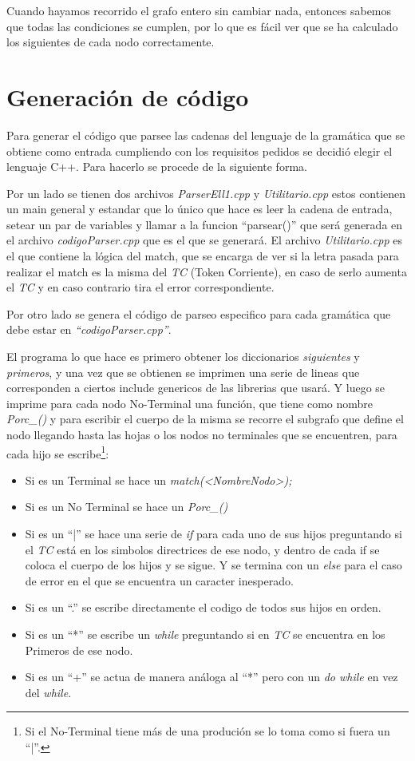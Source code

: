 \documentclass[a4paper]{report}
\begin{document}
	Cuando hayamos recorrido el grafo entero sin cambiar nada, entonces
sabemos que todas las condiciones se cumplen, por lo que es fácil ver que se ha
calculado los siguientes de cada nodo correctamente.


\section*{Generación de código}


Para generar el código que parsee las cadenas del lenguaje de la gramática que se 
obtiene como entrada cumpliendo con los requisitos pedidos se decidió elegir el lenguaje C++. Para hacerlo se procede de la siguiente forma.


Por un lado se tienen dos archivos \emph{ParserEll1.cpp} y \emph{Utilitario.cpp} estos contienen un main general y estandar
que lo único que hace es leer la cadena de entrada, setear un par de variables y llamar a la funcion ``parsear()'' 
que será generada en el archivo \emph{codigoParser.cpp} que es el que se generará. El archivo \emph{Utilitario.cpp} 
es el que contiene la lógica del match, que se encarga de ver si la letra pasada para realizar el match es la misma del \emph{TC} 
(Token Corriente), en caso de serlo aumenta el \emph{TC} y en caso contrario tira el error correspondiente.


Por otro lado se genera el código de parseo especifico para cada gramática que debe estar en \emph{``codigoParser.cpp''}.


El programa lo que hace es primero obtener los diccionarios \emph{siguientes} y \emph{primeros}, y una vez que se obtienen se imprimen una serie de lineas que corresponden a ciertos include genericos de las librerias que usará. Y luego se imprime para cada nodo No-Terminal una función, que tiene como nombre \emph{Porc\_<Nombre Nodo>()} y para escribir el cuerpo de la misma se recorre el subgrafo que define el nodo llegando hasta las hojas o los nodos no terminales que se encuentren, para cada hijo se escribe\footnote{Si el No-Terminal tiene más de una produción se lo toma como si fuera un ``|''.}:


\begin{itemize}
\item Si es un Terminal se hace un \emph{match(<NombreNodo>);}
\item Si es un No Terminal se hace un \emph{Porc\_<Nombre Nodo>()}
\item Si es un ``|'' se hace una serie de \emph{if} para cada uno de sus hijos preguntando si el \emph{TC} está en los simbolos directrices de ese nodo, y dentro de cada if se coloca el cuerpo de los hijos y se sigue. Y se termina con un \emph{else} para el caso de error en el que se encuentra un caracter inesperado.
\item Si es un ``.'' se escribe directamente el codigo de todos sus hijos en orden.
\item Si es un ``*'' se escribe un \emph{while} preguntando si en \emph{TC} se encuentra en los Primeros de ese nodo.
\item Si es un ``+'' se actua de manera análoga al ``*'' pero con un \emph{do while} en vez del \emph{while}.
\end{itemize}
\end{document}

